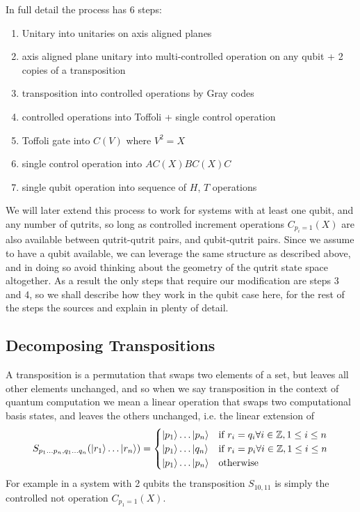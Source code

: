 In full detail the process has 6 steps:
\begin{enumerate}
	\item Unitary into unitaries on axis aligned planes
	\item axis aligned plane unitary into multi-controlled operation on any qubit + 2 copies of a transposition
	\item transposition into controlled operations by Gray codes
	\item controlled operations into Toffoli + single control operation
	\item Toffoli gate into $C(V)$ where $V^2 = X$
	\item single control operation into $AC(X)BC(X)C$
	\item single qubit operation into sequence of $H$, $T$ operations
\end{enumerate}
We will later extend this process to work for systems with at least one qubit, and any number of qutrits, so long as controlled increment operations $C_{p_i=1}(X)$ are also available between qutrit-qutrit pairs, and qubit-qutrit pairs. Since we assume to have a qubit available, we can leverage the same structure as described above, and in doing so avoid thinking about the geometry of the qutrit state space altogether. As a result the only steps that require our modification are steps 3 and 4, so we shall describe how they work in the qubit case here, for the rest of the steps the sources \cite{textbook} and \cite{universal-qubit} explain in plenty of detail.
\subsection{Decomposing Transpositions}
A transposition is a permutation that swaps two elements of a set, but leaves all other elements unchanged, and so when we say transposition in the context of quantum computation we mean a linear operation that swaps two computational basis states, and leaves the others unchanged, i.e. the linear extension of
\[S_{p_1\dots p_n, q_1\dots q_n}(| r_1 \rangle\dots| r_n \rangle) = \begin{cases}
| p_1 \rangle\dots| p_n \rangle & \text{if\ } r_i = q_i \forall i \in \mathbb{Z}, 1 \leq i \leq n \\
| p_1 \rangle\dots| q_n \rangle & \text{if\ } r_i = p_i \forall i \in \mathbb{Z}, 1 \leq i \leq n \\
| p_1 \rangle\dots| p_n \rangle & \text{otherwise}
\end{cases}
\]
For example in a system with 2 qubits the transposition $S_{10,11}$ is simply the controlled not operation $C_{p_1 = 1}(X)$.


